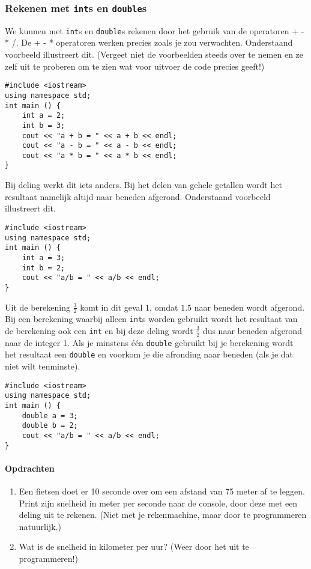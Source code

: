 \documentclass[12pt,a4paper]{article}
\newcommand{\icode}{\lstinline}
\begin{document}
\subsubsection{Rekenen met \icode{int}s en \icode{double}s}

We kunnen met \icode{int}s en \icode{double}s rekenen door het gebruik van de operatoren + - * /. 
De + - * operatoren werken precies zoals je zou verwachten. Onderstaand voorbeeld illustreert dit. (Vergeet niet de voorbeelden steeds over te nemen en ze zelf uit te proberen om te zien wat voor uitvoer de code precies geeft!) 
\begin{lstlisting}
#include <iostream> 
using namespace std; 
int main () {
	int a = 2; 
	int b = 3; 
	cout << "a + b = " << a + b << endl; 
	cout << "a - b = " << a - b << endl; 
	cout << "a * b = " << a * b << endl; 
}
\end{lstlisting}
Bij deling werkt dit iets anders. Bij het delen van gehele getallen wordt het resultaat namelijk altijd naar beneden afgerond. 
Onderstaand voorbeeld illustreert dit.
\begin{lstlisting}
#include <iostream> 
using namespace std; 
int main () {
	int a = 3; 
	int b = 2; 
	cout << "a/b = " << a/b << endl; 
}
\end{lstlisting}
Uit de berekening $\frac 32$ komt in dit geval $1$, omdat $1.5$ naar beneden wordt afgerond. Bij een 
berekening waarbij alleen \icode{int}s worden gebruikt wordt het resultaat van de berekening ook 
een \icode{int} en bij deze deling wordt $\frac 32$ dus naar beneden afgerond naar de integer 1. Als je minstens 
één \icode{double} gebruikt bij je berekening wordt het resultaat een \icode{double} en voorkom je 
die afronding naar beneden (als je dat niet wilt tenminste). 
\begin{lstlisting}
#include <iostream> 
using namespace std; 
int main () {
	double a = 3; 
	double b = 2; 
	cout << "a/b = " << a/b << endl; 
}
\end{lstlisting}

\paragraph{Opdrachten}
\begin{enumerate}
\item
	Een fietsen doet er 10 seconde over om een afstand van 75 meter af te leggen. Print zijn snelheid in meter per seconde naar de console, door deze met een deling uit te rekenen. (Niet met je rekenmachine, maar door te programmeren natuurlijk.) 
\item 
	Wat is de snelheid in kilometer per uur? (Weer door het uit te programmeren!)
\end{enumerate} 
\end{document}
